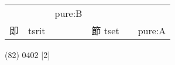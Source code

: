 \documentclass[14pt,a4paper]{scrartcl}
\begin{document}
\begin{longtable}[c]{@{}llllll@{}}
\begin{minipage}[t]{0.14\columnwidth}
\strut\end{minipage} &
\begin{minipage}[t]{0.14\columnwidth}\raggedright\strut
\strut\end{minipage} &
\begin{minipage}[t]{0.14\columnwidth}\raggedright\strut
pure:B
\strut\end{minipage}\tabularnewline
\begin{minipage}[t]{0.14\columnwidth}\raggedright\strut
即
\strut\end{minipage} &
\begin{minipage}[t]{0.14\columnwidth}\raggedright\strut
tsrit
\strut\end{minipage} &
\begin{minipage}[t]{0.14\columnwidth}\raggedright\strut
\strut\end{minipage} &
\begin{minipage}[t]{0.14\columnwidth}\raggedright\strut
節 tset
\strut\end{minipage} &
\begin{minipage}[t]{0.14\columnwidth}\raggedright\strut
\strut\end{minipage} &
\begin{minipage}[t]{0.14\columnwidth}\raggedright\strut
pure:A
\strut\end{minipage}\tabularnewline
\bottomrule
\end{longtable}

(82) 0402 {[}2{]}
\end{document}
